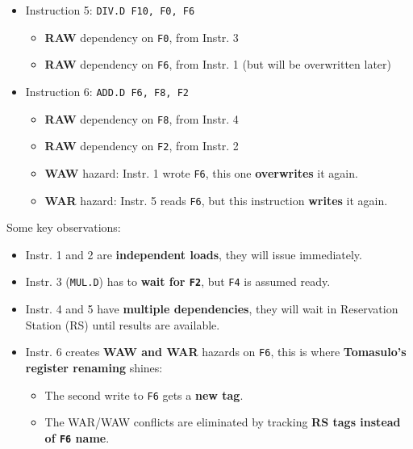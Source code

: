 \begin{examplebox}
\begin{itemize}
        \item Instruction 5: \texttt{DIV.D F10, F0, F6}
        \begin{itemize}
            \item \textbf{RAW} dependency on \texttt{F0}, from Instr. 3
            \item \textbf{RAW} dependency on \texttt{F6}, from Instr. 1 (but will be overwritten later)
        \end{itemize}

        \item Instruction 6: \texttt{ADD.D F6, F8, F2}
        \begin{itemize}
            \item \textbf{RAW} dependency on \texttt{F8}, from Instr. 4
            \item \textbf{RAW} dependency on \texttt{F2}, from Instr. 2
            \item \textbf{WAW} hazard: Instr. 1 wrote \texttt{F6}, this one \textbf{overwrites} it again.
            \item \textbf{WAR} hazard: Instr. 5 reads \texttt{F6}, but this instruction \textbf{writes} it again.
        \end{itemize}
    \end{itemize}
    Some key observations:
    \begin{itemize}
        \item Instr. 1 and 2 are \textbf{independent loads}, they will issue immediately.
        \item Instr. 3 (\texttt{MUL.D}) has to \textbf{wait for \texttt{F2}}, but \texttt{F4} is assumed ready.
        \item Instr. 4 and 5 have \textbf{multiple dependencies}, they will wait in Reservation Station (RS) until results are available.
        \item Instr. 6 creates \textbf{WAW and WAR} hazards on \texttt{F6}, this is where \textbf{Tomasulo's register renaming} shines:
        \begin{itemize}
            \item The second write to \texttt{F6} gets a \textbf{new tag}.
            \item The WAR/WAW conflicts are eliminated by tracking \textbf{RS tags instead of \texttt{F6} name}.
        \end{itemize}
    \end{itemize}
\end{examplebox}

